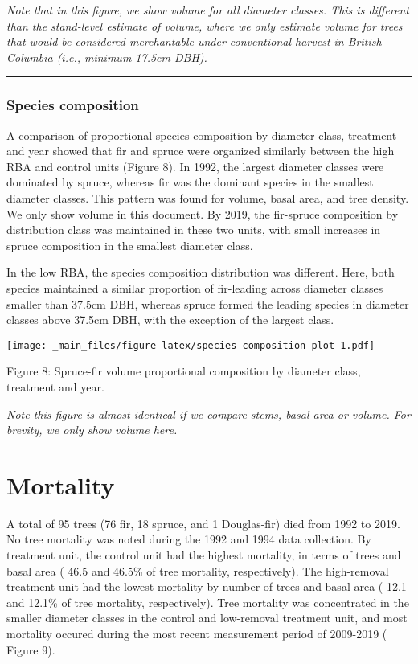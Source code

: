 \documentclass[
]{article}
\begin{document}
\emph{Note that in this figure, we show volume for all diameter classes. This is different than the stand-level estimate of volume, where we only estimate volume for trees that would be considered merchantable under conventional harvest in British Columbia (i.e., minimum 17.5cm DBH).}

\begin{center}\rule{0.5\linewidth}{0.5pt}\end{center}

\hypertarget{species-composition}{%
\subsubsection{Species composition}\label{species-composition}}

A comparison of proportional species composition by diameter class, treatment and year showed that fir and spruce were organized similarly between the high RBA and control units (Figure 8). In 1992, the largest diameter classes were dominated by spruce, whereas fir was the dominant species in the smallest diameter classes. This pattern was found for volume, basal area, and tree density. We only show volume in this document. By 2019, the fir-spruce composition by distribution class was maintained in these two units, with small increases in spruce composition in the smallest diameter class.

In the low RBA, the species composition distribution was different. Here, both species maintained a similar proportion of fir-leading across diameter classes smaller than 37.5cm DBH, whereas spruce formed the leading species in diameter classes above 37.5cm DBH, with the exception of the largest class.

\texttt{[image: \_main\_files/figure-latex/species composition plot-1.pdf]}

Figure 8: Spruce-fir volume proportional composition by diameter class, treatment and year.

\emph{Note this figure is almost identical if we compare stems, basal area or volume. For brevity, we only show volume here.}

\hypertarget{mortality}{%
\section{Mortality}\label{mortality}}

A total of 95 trees (76 fir, 18 spruce, and 1 Douglas-fir) died from 1992 to 2019. No tree mortality was noted during the 1992 and 1994 data collection. By treatment unit, the control unit had the highest mortality, in terms of trees and basal area (
46.5 and
46.5\% of tree mortality, respectively). The high-removal treatment unit had the lowest mortality by number of trees and basal area (
12.1 and
12.1\% of tree mortality, respectively). Tree mortality was concentrated in the smaller diameter classes in the control and low-removal treatment unit, and most mortality occured during the most recent measurement period of 2009-2019 (
Figure 9).
\end{document}

